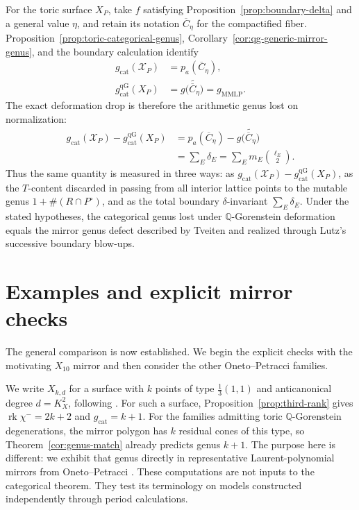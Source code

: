 \documentclass[11pt]{article}
\theoremstyle{plain}
\theoremstyle{definition}
\theoremstyle{remark}
\newcommand{\rk}{\operatorname{rk}}
\newcommand{\Q}{\mathbb Q}
\newcommand{\1}{\mathbf 1}
\begin{document}
\begin{samepage}
For the toric surface $X_P$, take $f$ satisfying Proposition~\ref{prop:boundary-delta} and a general value $\eta$, and retain its notation $\overline C_\eta$ for the compactified fiber.  Proposition~\ref{prop:toric-categorical-genus}, Corollary~\ref{cor:qg-generic-mirror-genus}, and the boundary calculation identify
\[
\begin{aligned}
g_{\mathrm{cat}}(\mathcal X_P)&=p_a(\overline C_\eta),\\
g_{\mathrm{cat}}^{\mathrm{qG}}(X_P)&=g\bigl(\widetilde{\overline C_\eta}\bigr)=g_{\mathrm{MMLP}}.
\end{aligned}
\]
The exact deformation drop is therefore the arithmetic genus lost on normalization:
\[
\boxed{\begin{aligned}
g_{\mathrm{cat}}(\mathcal X_P)-g_{\mathrm{cat}}^{\mathrm{qG}}(X_P)
&=p_a(\overline C_\eta)-g\bigl(\widetilde{\overline C_\eta}\bigr)\\
&=\sum_E\delta_E=\sum_E m_E\binom{\ell_E}{2}.
\end{aligned}}
\]
Thus the same quantity is measured in three ways: as $g_{\mathrm{cat}}(\mathcal X_P)-g_{\mathrm{cat}}^{\mathrm{qG}}(X_P)$, as the $T$-content discarded in passing from all interior lattice points to the mutable genus $1+\#(R\cap P^\circ)$, and as the total boundary $\delta$-invariant $\sum_E\delta_E$.  Under the stated hypotheses, the categorical genus lost under $\Q$-Gorenstein deformation equals the mirror genus defect described by Tveiten and realized through Lutz's successive boundary blow-ups.
\end{samepage}

\section{Examples and explicit mirror checks}\label{sec:explicit-mirrors}

The general comparison is now established.  We begin the explicit checks with the motivating $X_{10}$ mirror and then consider the other Oneto--Petracci families.

We write $X_{k,d}$ for a surface with $k$ points of type $\frac13(1,1)$ and anticanonical degree $d=K_X^2$, following \cite[Section 7]{OP}.  For such a surface, Proposition~\ref{prop:third-rank} gives $\rk\chi^-=2k+2$ and $g_{\mathrm{cat}}=k+1$.  For the families admitting toric $\Q$-Gorenstein degenerations, the mirror polygon has $k$ residual cones of this type, so Theorem~\ref{cor:genus-match} already predicts genus $k+1$.  The purpose here is different: we exhibit that genus directly in representative Laurent-polynomial mirrors from Oneto--Petracci \cite[Section 7]{OP}.  These computations are not inputs to the categorical theorem.  They test its terminology on models constructed independently through period calculations.
\end{document}

